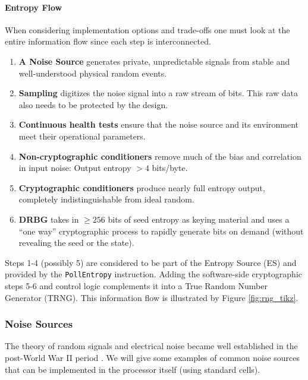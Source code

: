     \paragraph{Entropy Flow}
    When considering implementation options and trade-offs one must look
    at the entire information flow since each step is interconnected.

    \begin{enumerate}
    \item   {\bf A Noise Source} generates private, unpredictable signals
            from stable and well-understood physical random events.
    \item   {\bf Sampling} digitizes the noise signal into a raw stream of
            bits. This raw data also needs to be protected by the design.
    \item   {\bf Continuous health tests} ensure that the noise source
            and its environment meet their operational parameters.
    \item   {\bf Non-cryptographic conditioners} remove much of the bias
            and correlation in input noise: Output entropy $>4$ bits/byte.
    \item   {\bf Cryptographic conditioners} produce nearly full entropy
            output, completely indistinguishable from ideal random.
    \item   {\bf DRBG} takes in $\geq 256$ bits of seed entropy as keying
            material and uses a ``one way'' cryptographic process to rapidly
            generate bits on demand (without revealing the seed or the state).
    \end{enumerate}
    Steps 1-4 (possibly 5) are considered to be part of the Entropy
    Source (ES) and provided by the \verb|PollEntropy| instruction.
    Adding the software-side cryptographic steps 5-6 and control logic
    complements it into a True Random Number Generator (TRNG).
    This information flow is illustrated by Figure \ref{fig:rng_tikz}.

\subsubsection{Noise Sources}
\label{sec:noise-sources}

    The theory of random signals and electrical noise became well
    established in the post-World War II period \cite{Ri44,Ri45,DaRo58}.
    We will give some examples of common noise sources that can be
    implemented in the processor itself (using standard cells).

